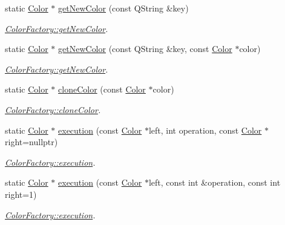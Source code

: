 \begin{DoxyCompactItemize}
static \hyperlink{class_color}{Color} $\ast$ \hyperlink{class_color_factory_a0b8412fa33dd5eaefff38412a96fc638}{get\+New\+Color} (const Q\+String \&key)
\begin{DoxyCompactList}\small\item\em \hyperlink{class_color_factory_a0b8412fa33dd5eaefff38412a96fc638}{Color\+Factory\+::get\+New\+Color}. \end{DoxyCompactList}\item 
static \hyperlink{class_color}{Color} $\ast$ \hyperlink{class_color_factory_a1fcc2e8e07462cd0932317144c712c86}{get\+New\+Color} (const Q\+String \&key, const \hyperlink{class_color}{Color} $\ast$color)
\begin{DoxyCompactList}\small\item\em \hyperlink{class_color_factory_a0b8412fa33dd5eaefff38412a96fc638}{Color\+Factory\+::get\+New\+Color}. \end{DoxyCompactList}\item 
static \hyperlink{class_color}{Color} $\ast$ \hyperlink{class_color_factory_a2c20174b2a883ee984ddb21d4cb31b5f}{clone\+Color} (const \hyperlink{class_color}{Color} $\ast$color)
\begin{DoxyCompactList}\small\item\em \hyperlink{class_color_factory_a2c20174b2a883ee984ddb21d4cb31b5f}{Color\+Factory\+::clone\+Color}. \end{DoxyCompactList}\item 
static \hyperlink{class_color}{Color} $\ast$ \hyperlink{class_color_factory_a011ad08eec6d8b4f6e8bba6da64ec345}{execution} (const \hyperlink{class_color}{Color} $\ast$left, int operation, const \hyperlink{class_color}{Color} $\ast$right=nullptr)
\begin{DoxyCompactList}\small\item\em \hyperlink{class_color_factory_a011ad08eec6d8b4f6e8bba6da64ec345}{Color\+Factory\+::execution}. \end{DoxyCompactList}\item 
static \hyperlink{class_color}{Color} $\ast$ \hyperlink{class_color_factory_a35ec83ba9159727511989055e7868d63}{execution} (const \hyperlink{class_color}{Color} $\ast$left, const int \&operation, const int right=1)
\begin{DoxyCompactList}\small\item\em \hyperlink{class_color_factory_a011ad08eec6d8b4f6e8bba6da64ec345}{Color\+Factory\+::execution}. \end{DoxyCompactList}\item 

\end{DoxyCompactItemize}
